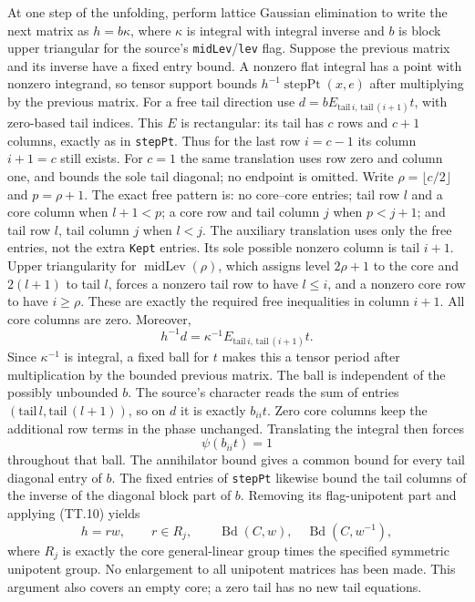 At one step of the unfolding, perform lattice Gaussian elimination
to write the next matrix as $h=b\kappa$, where $\kappa$ is
integral with integral inverse and $b$ is block upper triangular
for the source's \texttt{midLev}/\texttt{lev} flag. Suppose the
previous matrix and its inverse have a fixed entry bound. A nonzero
flat integral has a point with nonzero integrand, so tensor support
bounds $h^{-1}\operatorname{stepPt}(x,e)$ after multiplying by
the previous matrix. For a free tail direction use
$d=bE_{\mathrm{tail}\,i,\,\mathrm{tail}\,(i+1)}t$, with
zero-based tail indices. This $E$ is rectangular: its tail has
$c$ rows and $c+1$ columns, exactly as in \texttt{stepPt}.
Thus for the last row $i=c-1$ its column $i+1=c$ still exists.
For $c=1$ the same translation uses row zero and column one,
and bounds the sole tail diagonal; no endpoint is omitted.
Write $\rho=\lfloor c/2\rfloor$ and $p=\rho+1$. The exact free pattern is: no core--core entries;
tail row $l$ and a core column when $l+1<p$; a core row and tail
column $j$ when $p<j+1$; and tail row $l$, tail column $j$ when
$l<j$. The auxiliary translation uses only the free entries,
not the extra \texttt{Kept} entries. Its sole possible nonzero
column is tail $i+1$. Upper triangularity for
$\operatorname{midLev}(\rho)$, which assigns level $2\rho+1$
to the core and $2(l+1)$ to tail $l$, forces a nonzero tail row
to have $l\leq i$, and a nonzero core row to have $i\geq\rho$.
These are exactly the required free inequalities in column $i+1$.
All core columns are zero. Moreover,
\[
 h^{-1}d=\kappa^{-1}E_{\mathrm{tail}\,i,\,\mathrm{tail}\,(i+1)}t.
\]
Since $\kappa^{-1}$ is integral, a fixed ball for $t$ makes this
a tensor period after multiplication by the bounded previous
matrix. The ball is independent of the possibly unbounded $b$.
The source's character reads the sum of entries
$(\mathrm{tail}\,l,\mathrm{tail}\,(l+1))$, so on $d$ it is
exactly $b_{ii}t$. Zero core columns keep the additional row
terms in the phase unchanged. Translating the integral then forces
\[
                    \psi(b_{ii}t)=1                         \tag{TT.11}
\]
throughout that ball. The annihilator bound gives a common bound
for every tail diagonal entry of $b$. The fixed entries of
\texttt{stepPt} likewise bound the tail columns of the inverse
of the diagonal block part of $b$. Removing its flag-unipotent
part and applying (TT.10) yields
\[
                  h=r w,\qquad r\in R_j,\qquad
     \operatorname{Bd}(C,w),\quad\operatorname{Bd}(C,w^{-1}), \tag{TT.12}
\]
where $R_j$ is exactly the core general-linear group times the
specified symmetric unipotent group. No enlargement to all
unipotent matrices has been made. This argument also covers an
empty core; a zero tail has no new tail equations.

